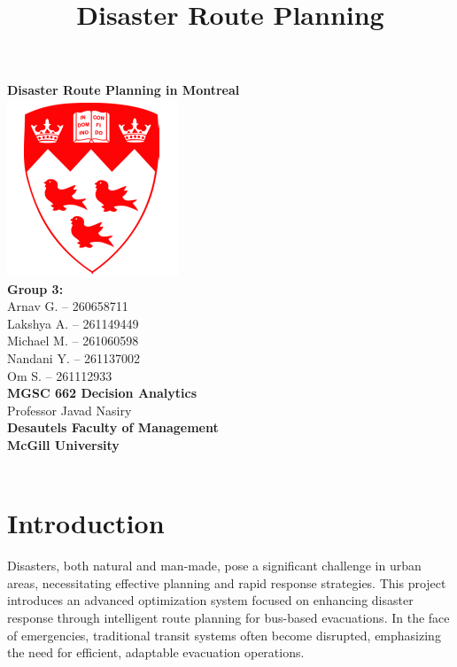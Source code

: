 \documentclass[12pt]{article}
\title{Disaster Route Planning}
\author{} %
\date{} %
\begin{document}
\begin{titlepage}
    \centering
    \vspace*{1 cm}
    \textbf{\Large Disaster Route Planning in Montreal}\\[2 cm] %
    \includegraphics[scale=0.5]{mcgill_logo.png}\\[1 cm] %
    \textbf{Group 3:}\\[0.5 cm]
    Arnav G. -- 260658711\\
    Lakshya A. -- 261149449\\
    Michael M. -- 261060598\\
    Nandani Y. -- 261137002\\
    Om S. -- 261112933\\[1 cm]
    \textbf{MGSC 662 Decision Analytics}\\[0.5 cm]
    Professor Javad Nasiry\\[1 cm]
    \textbf{Desautels Faculty of Management}\\
    \textbf{McGill University}\\[2 cm]
    \textcolor{red}{\hrulefill}\\[0.5 cm]
\end{titlepage}


\tableofcontents
\newpage


\section{Introduction}
Disasters, both natural and man-made, pose a significant challenge in urban areas, necessitating effective planning and rapid response strategies. This project introduces an advanced optimization system focused on enhancing disaster response through intelligent route planning for bus-based evacuations. In the face of emergencies, traditional transit systems often become disrupted, emphasizing the need for efficient, adaptable evacuation operations.
\end{document}
